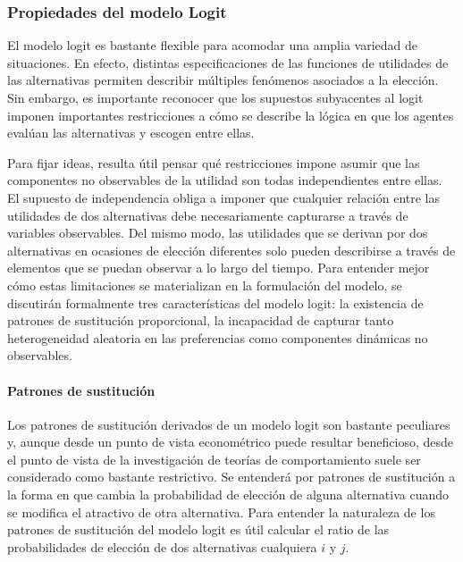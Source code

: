 \documentclass[
]{book}
\begin{document}
\subsubsection{Propiedades del modelo Logit}\label{propiedades-del-modelo-logit}

El modelo logit es bastante flexible para acomodar una amplia variedad de situaciones. En efecto, distintas especificaciones de las funciones de utilidades de las alternativas permiten describir múltiples fenómenos asociados a la elección. Sin embargo, es importante reconocer que los supuestos subyacentes al logit imponen importantes restricciones a cómo se describe la lógica en que los agentes evalúan las alternativas y escogen entre ellas.

Para fijar ideas, resulta útil pensar qué restricciones impone asumir que las componentes no observables de la utilidad son todas independientes entre ellas. El supuesto de independencia obliga a imponer que cualquier relación entre las utilidades de dos alternativas debe necesariamente capturarse a través de variables observables. Del mismo modo, las utilidades que se derivan por dos alternativas en ocasiones de elección diferentes solo pueden describirse a través de elementos que se puedan observar a lo largo del tiempo. Para entender mejor cómo estas limitaciones se materializan en la formulación del modelo, se discutirán formalmente tres características del modelo logit: la existencia de patrones de sustitución proporcional, la incapacidad de capturar tanto heterogeneidad aleatoria en las preferencias como componentes dinámicas no observables.

\paragraph*{Patrones de sustitución}\label{patrones-de-sustituciuxf3n}

Los patrones de sustitución derivados de un modelo logit son bastante peculiares y, aunque desde un punto de vista econométrico puede resultar beneficioso, desde el punto de vista de la investigación de teorías de comportamiento suele ser considerado como bastante restrictivo. Se entenderá por patrones de sustitución a la forma en que cambia la probabilidad de elección de alguna alternativa cuando se modifica el atractivo de otra alternativa. Para entender la naturaleza de los patrones de sustitución del modelo logit es útil calcular el ratio de las probabilidades de elección de dos alternativas cualquiera \(i\) y \(j\).
\end{document}
